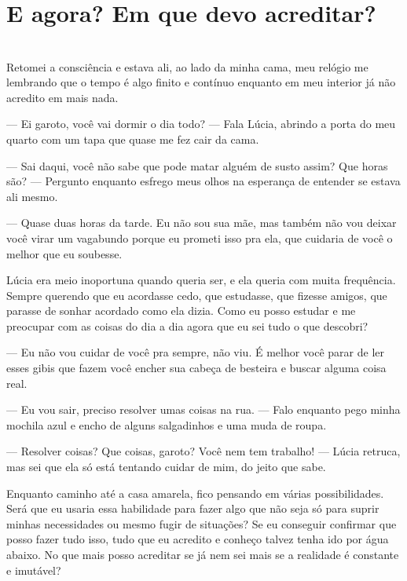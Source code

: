 \newpage
\ifdefined\useChapters
\chapter{E agora? Em que devo acreditar?}
\else
\chapter{}
\fi

Retomei a consciência e estava ali, ao lado da minha cama, meu relógio me lembrando que o tempo é algo finito e contínuo enquanto em meu interior já não acredito em mais nada.

— Ei garoto, você vai dormir o dia todo? — Fala Lúcia, abrindo a porta do meu quarto com um tapa que quase me fez cair da cama.

— Sai daqui, você não sabe que pode matar alguém de susto assim? Que horas são? — Pergunto enquanto esfrego meus olhos na esperança de entender se estava ali mesmo.

— Quase duas horas da tarde. Eu não sou sua mãe, mas também não vou deixar você virar um vagabundo porque eu prometi isso pra ela, que cuidaria de você o melhor que eu soubesse.

Lúcia era meio inoportuna quando queria ser, e ela queria com muita frequência. Sempre querendo que eu acordasse cedo, que estudasse, que fizesse amigos, que parasse de sonhar acordado como ela dizia. Como eu posso estudar e me preocupar com as coisas do dia a dia agora que eu sei tudo o que descobri?

— Eu não vou cuidar de você pra sempre, não viu. É melhor você parar de ler esses gibis que fazem você encher sua cabeça de besteira e buscar alguma coisa real.

— Eu vou sair, preciso resolver umas coisas na rua. — Falo enquanto pego minha mochila azul e encho de alguns salgadinhos e uma muda de roupa.

— Resolver coisas? Que coisas, garoto? Você nem tem trabalho! — Lúcia retruca, mas sei que ela só está tentando cuidar de mim, do jeito que sabe.

Enquanto caminho até a casa amarela, fico pensando em várias possibilidades. Será que eu usaria essa habilidade para fazer algo que não seja só para suprir minhas necessidades ou mesmo fugir de situações? Se eu conseguir confirmar que posso fazer tudo isso, tudo que eu acredito e conheço talvez tenha ido por água abaixo. No que mais posso acreditar se já nem sei mais se a realidade é constante e imutável?

